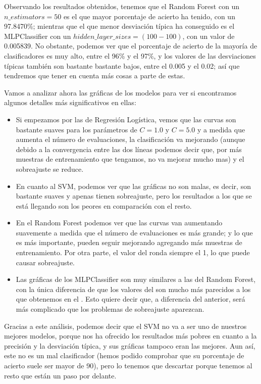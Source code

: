 \documentclass[11pt,a4paper]{article}
\begin{document}
Observando los resultados obtenidos, tenemos que el Random Forest con un $n\_estimators = 50$ es el que mayor porcentaje de acierto ha
tenido, con un 97.8470\%; mientras que el que menor desviación típica ha conseguido es el MLPClassifier con un $hidden\_layer\_sizes =
(100-100)$, con un valor de 0.005839. No obstante, podemos ver que el porcentaje de acierto de la mayoría de clasificadores es muy alto,
entre el 96\% y el 97\%, y los valores de las desviaciones típicas también son bastante bastante bajos, entre el 0.005 y el 0.02; así que
tendremos que tener en cuenta más cosas a parte de estas.

Vamos a analizar ahora las gráficas de los modelos para ver si encontramos algunos detalles más significativos en ellas:
\begin{itemize}[label=\textbullet]
\item Si empezamos por las de Regresión Logística, vemos que las curvas son bastante suaves  para los parámetros de $C = 1.0$ y $C = 5.0$ y a
medida que aumenta el número de evaluaciones, la clasificación va mejorando (aunque debido a la convergencia entre las dos líneas podemos
decir que, por más muestras de entrenamiento que tengamos, no va mejorar mucho mas) y el sobreajuste se reduce.

\item En cuanto al SVM, podemos ver que las gráficas no son malas, es decir, son bastante suaves y apenas tienen sobreajuste, pero los resultados a
los que se está llegando son los peores en comparación con el resto.

\item En el Random Forest podemos ver que las curvas van aumentando suavemente a medida que el número de evaluaciones es más grande; y lo que es más importante, pueden seguir mejorando agregando más muestras de entrenamiento. Por otra parte, el valor del  ronda siempre el 1, lo que puede causar sobreajuste.

\item Las gráficas de los MLPClassifier son muy similares a las del Random Forest, con la única diferencia de que los valores del 
 son mucho más parecidos a los que obtenemos en el . Esto quiere decir que, a diferencia del anterior, será más complicado que los problemas de sobreajuste aparezcan.
\end{itemize}
Gracias a este análisis, podemos decir que el SVM no va a ser uno de nuestros mejores modelos, porque nos ha ofrecido los resultados más
pobres en cuanto a la precisión y la desviación típica, y sus gráficas tampoco eran las mejores. Aun así, este no es un mal clasificador
(hemos podido comprobar que su porcentaje de acierto suele ser mayor de 90), pero lo tenemos que descartar porque tenemos al resto que
están un paso por delante.
\end{document}
